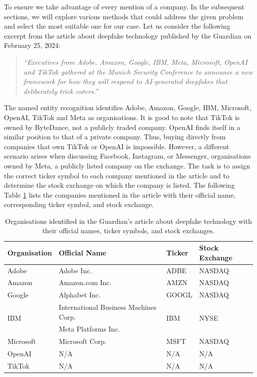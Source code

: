 To ensure we take advantage of every mention of a company. In the subsequent sections, we will explore various methods that could address the given problem and select the most suitable one for our case. Let us consider the following excerpt from the article \parencite{TheGuardiaArticleDeepFake} about deepfake technology published by the Guardian on February 25, 2024:\begin{quote}
    \textit{``Executives from Adobe, Amazon, Google, IBM, Meta, Microsoft, OpenAI and TikTok gathered at the Munich Security Conference to announce a new framework for how they will respond to AI-generated deepfakes that deliberately trick voters.''}
\end{quote} The named entity recognition identifies Adobe, Amazon, Google, IBM, Microsoft, OpenAI, TikTok and Meta as organisations. It is good to note that TikTok is owned by ByteDance, not a publicly traded company. OpenAI finds itself in a similar position to that of a private company. Thus, buying directly from companies that own TikTok or OpenAI is impossible. However, a different scenario arises when discussing Facebook, Instagram, or Messenger, organisations owned by Meta, a publicly listed company on the exchange. The task is to assign the correct ticker symbol to each company mentioned in the article and to determine the stock exchange on which the company is listed. The following Table \ref{table:deepfake-article-excerpt} lists the companies mentioned in the article with their official name, corresponding ticker symbol, and stock exchange.

\begin{table}[ht]
    \centering
    \caption{Organisations identified in the Guardian's article about deepfake technology with their official names, ticker symbols, and stock exchanges.}
    \label{table:deepfake-article-excerpt}
    \begin{tabular}{l p{4cm} l l}
        \hline
        Organisation&Official Name&Ticker&Stock Exchange\\
        \hline
        Adobe&Adobe Inc.&ADBE&NASDAQ\\
        Amazon&Amazon.com Inc.&AMZN&NASDAQ\\
        Google&Alphabet Inc.&GOOGL&NASDAQ\\
        \multirow{2}{*}{IBM}&International Business Machines Corp.&\multirow{2}{*}{IBM}&\multirow{2}{*}{NYSE}\\
        Meta&Meta Platforms Inc.&META&NASDAQ\\        
        Microsoft&Microsoft Corp.&MSFT&NASDAQ\\
        OpenAI&N/A&N/A&N/A\\
        TikTok&N/A&N/A&N/A\\
        \hline
    \end{tabular}
\end{table}

